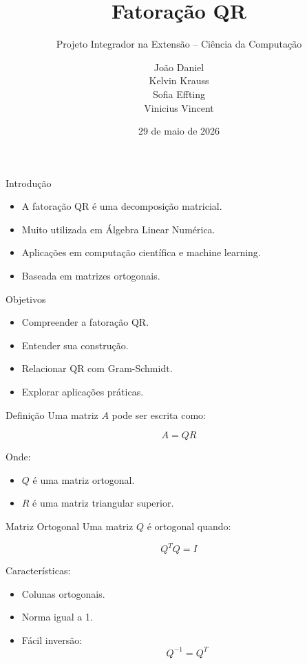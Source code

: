 \documentclass{beamer}
\title{Fatoração QR}
\subtitle{Projeto Integrador na Extensão -- Ciência da Computação}
\author{
João Daniel \\
Kelvin Krauss \\
Sofia Effting \\
Vinicius Vincent
}
\institute{Instituto Federal Catarinense - Campus Blumenau}
\date{29 de maio de 2026}
\begin{document}
\begin{frame}
\titlepage
\end{frame}

\begin{frame}{Introdução}
\begin{itemize}
    \item A fatoração QR é uma decomposição matricial.
    \item Muito utilizada em Álgebra Linear Numérica.
    \item Aplicações em computação científica e machine learning.
    \item Baseada em matrizes ortogonais.
\end{itemize}
\end{frame}

\begin{frame}{Objetivos}
\begin{itemize}
    \item Compreender a fatoração QR.
    \item Entender sua construção.
    \item Relacionar QR com Gram-Schmidt.
    \item Explorar aplicações práticas.
\end{itemize}
\end{frame}

\begin{frame}{Definição}
Uma matriz $A$ pode ser escrita como:

\[
A = QR
\]

Onde:

\begin{itemize}
    \item $Q$ é uma matriz ortogonal.
    \item $R$ é uma matriz triangular superior.
\end{itemize}
\end{frame}

\begin{frame}{Matriz Ortogonal}
Uma matriz $Q$ é ortogonal quando:

\[
Q^TQ = I
\]

Características:
\begin{itemize}
    \item Colunas ortogonais.
    \item Norma igual a 1.
    \item Fácil inversão:
    \[
    Q^{-1} = Q^T
    \]
\end{itemize}
\end{frame}
\end{document}
